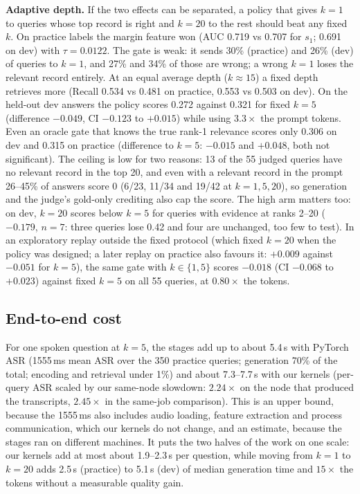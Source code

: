 \documentclass{article}
\begin{document}
\textbf{Adaptive depth.} If the two effects can be separated, a policy that gives $k=1$ to queries whose top record is right and $k=20$ to the rest should beat any fixed $k$. On practice labels the margin feature won (AUC 0.719 vs 0.707 for $s_1$; 0.691 on dev) with $\tau=0.0122$. The gate is weak: it sends 30\% (practice) and 26\% (dev) of queries to $k=1$, and 27\% and 34\% of those are wrong; a wrong $k=1$ loses the relevant record entirely. At an equal average depth ($k\approx15$) a fixed depth retrieves more (Recall 0.534 vs 0.481 on practice, 0.553 vs 0.503 on dev). On the held-out dev answers the policy scores 0.272 against 0.321 for fixed $k=5$ (difference $-0.049$, CI $-0.123$ to $+0.015$) while using $3.3\times$ the prompt tokens. Even an oracle gate that knows the true rank-1 relevance scores only 0.306 on dev and 0.315 on practice (difference to $k=5$: $-0.015$ and $+0.048$, both not significant). The ceiling is low for two reasons: 13 of the 55 judged queries have no relevant record in the top 20, and even with a relevant record in the prompt 26--45\% of answers score 0 (6/23, 11/34 and 19/42 at $k=1,5,20$), so generation and the judge's gold-only crediting also cap the score. The high arm matters too: on dev, $k=20$ scores below $k=5$ for queries with evidence at ranks 2--20 ($-0.179$, $n=7$: three queries lose 0.42 and four are unchanged, too few to test). In an exploratory replay outside the fixed protocol (which fixed $k=20$ when the policy was designed; a later replay on practice also favours it: $+0.009$ against $-0.051$ for $k=5$), the same gate with $k\in\{1,5\}$ scores $-0.018$ (CI $-0.068$ to $+0.023$) against fixed $k=5$ on all 55 queries, at $0.80\times$ the tokens.

\subsection{End-to-end cost}

For one spoken question at $k=5$, the stages add up to about 5.4\,s with PyTorch ASR (1555\,ms mean ASR over the 350 practice queries; generation 70\% of the total; encoding and retrieval under 1\%) and about 7.3--7.7\,s with our kernels (per-query ASR scaled by our same-node slowdown: $2.24\times$ on the node that produced the transcripts, $2.45\times$ in the same-job comparison). This is an upper bound, because the 1555\,ms also includes audio loading, feature extraction and process communication, which our kernels do not change, and an estimate, because the stages ran on different machines. It puts the two halves of the work on one scale: our kernels add at most about 1.9--2.3\,s per question, while moving from $k=1$ to $k=20$ adds 2.5\,s (practice) to 5.1\,s (dev) of median generation time and $15\times$ the tokens without a measurable quality gain.
\end{document}
